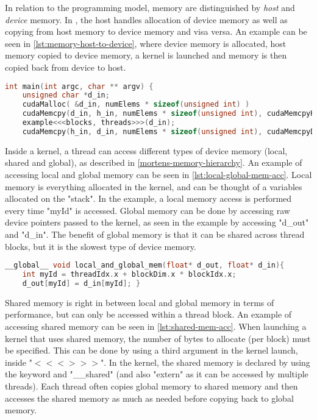 In relation to the \cuda{} programming model, memory are distinguished by \textit{host} and \textit{device} memory.
In \cuda{}, the host handles allocation of device memory as well as copying from host memory to device memory and visa versa.
An example can be seen in \autoref{lst:memory-host-to-device}, where device memory is allocated, host memory copied to device memory, a kernel is launched and memory is then copied back from device to host.
\begin{lstlisting}[language=C++,caption={Example of allocation and copying from host to device},label=lst:memory-host-to-device]
int main(int argc, char ** argv) {
	unsigned char *d_in;
	cudaMalloc( &d_in, numElems * sizeof(unsigned int) )
	cudaMemcpy(d_in, h_in, numElems * sizeof(unsigned int), cudaMemcpyHostToDevice)
	example<<<blocks, threads>>>(d_in);
	cudaMemcpy(h_in, d_in, numElems * sizeof(unsigned int), cudaMemcpyDeviceToHost) }
\end{lstlisting}
Inside a kernel, a thread can access different types of device memory (local, shared and global), as described in \autoref{mortens-memory-hierarchy}.
An example of accessing local and global memory can be seen in \autoref{lst:local-global-mem-acc}.
Local memory is everything allocated in the kernel, and can be thought of a variables allocated on the "stack". In the example, a local memory access is performed every time "myId" is accessed.
Global memory can be done by accessing raw device pointers passed to the kernel, as seen in the example by accessing "d\_out" and "d\_in".
The benefit of global memory is that it can be shared across thread blocks, but it is the slowest type of device memory.
\begin{lstlisting}[language=C,caption={Local and global memory access},label=lst:local-global-mem-acc]
__global__ void local_and_global_mem(float* d_out, float* d_in){
	int myId = threadIdx.x + blockDim.x * blockIdx.x;
	d_out[myId] = d_in[myId]; }
\end{lstlisting}
Shared memory is right in between local and global memory in terms of performance, but can only be accessed within a thread block.
An example of accessing shared memory can be seen in \autoref{lst:shared-mem-acc}.
When launching a kernel that uses shared memory, the number of bytes to allocate (per block) must be specified.
This can be done by using a third argument in the kernel launch, inside "$<<< >>>$".
In the kernel, the shared memory is declared by using the keyword and "\_\_shared" (and also "extern" as it can be accessed by multiple threads).
Each thread often copies global memory to shared memory and then accesses the shared memory as much as needed before copying back to global memory.
